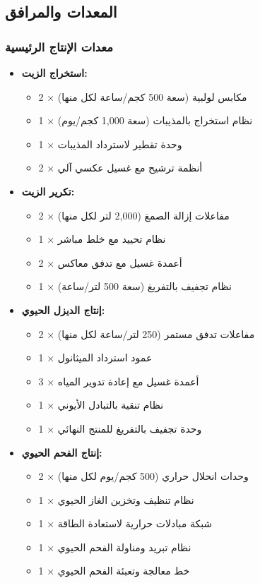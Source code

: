\subsection{المعدات والمرافق}

\subsubsection{معدات الإنتاج الرئيسية}
\begin{itemize}
    \item \textbf{استخراج الزيت:}
    \begin{itemize}
        \item 2 × مكابس لولبية (سعة 500 كجم/ساعة لكل منها)
        \item 1 × نظام استخراج بالمذيبات (سعة 1,000 كجم/يوم)
        \item 1 × وحدة تقطير لاسترداد المذيبات
        \item 2 × أنظمة ترشيح مع غسيل عكسي آلي
    \end{itemize}
    
    \item \textbf{تكرير الزيت:}
    \begin{itemize}
        \item 2 × مفاعلات إزالة الصمغ (2,000 لتر لكل منها)
        \item 1 × نظام تحييد مع خلط مباشر
        \item 2 × أعمدة غسيل مع تدفق معاكس
        \item 1 × نظام تجفيف بالتفريغ (سعة 500 لتر/ساعة)
    \end{itemize}
    
    \item \textbf{إنتاج الديزل الحيوي:}
    \begin{itemize}
        \item 2 × مفاعلات تدفق مستمر (250 لتر/ساعة لكل منها)
        \item 1 × عمود استرداد الميثانول
        \item 3 × أعمدة غسيل مع إعادة تدوير المياه
        \item 1 × نظام تنقية بالتبادل الأيوني
        \item 1 × وحدة تجفيف بالتفريغ للمنتج النهائي
    \end{itemize}
    
    \item \textbf{إنتاج الفحم الحيوي:}
    \begin{itemize}
        \item 2 × وحدات انحلال حراري (500 كجم/يوم لكل منها)
        \item 1 × نظام تنظيف وتخزين الغاز الحيوي
        \item 1 × شبكة مبادلات حرارية لاستعادة الطاقة
        \item 1 × نظام تبريد ومناولة الفحم الحيوي
        \item 1 × خط معالجة وتعبئة الفحم الحيوي
    \end{itemize}
\end{itemize}

